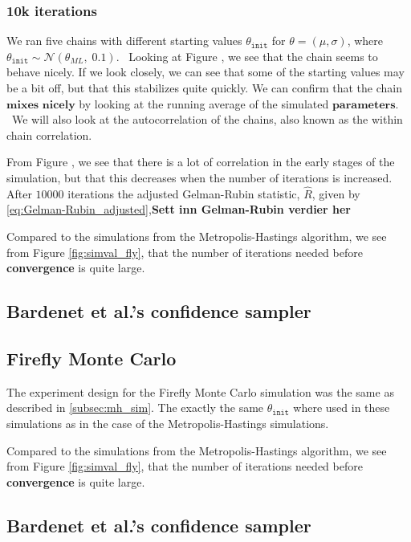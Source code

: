 \subsubsection{10k iterations}
We ran five chains with different starting values $\theta_{\texttt{init}}$ for $\theta = \left(\mu, \sigma\right)$, where $\theta_{\texttt{init}} \sim \mathcal{N}\left(\theta_{ML}, \; 0.1\right)$. 
\
Looking at Figure , we see that the chain seems to behave nicely. If we look closely, we can see that some of the starting values may be a bit off, but that this stabilizes quite quickly. We can confirm that the chain $\textbf{mixes nicely}$ by looking at the running average of the simulated $\textbf{parameters}$.
\
We will also look at the autocorrelation of the chains, also known as the within chain correlation. 

From Figure , we see that there is a lot of correlation in the early stages of the simulation, but that this decreases when the number of iterations is increased. After $10000$ iterations the adjusted Gelman-Rubin statistic, $\hat{R}$, given by \eqref{eq:Gelman-Rubin_adjusted},\textbf{Sett inn Gelman-Rubin verdier her}

Compared to the simulations from the Metropolis-Hastings algorithm, we see from Figure \ref{fig:simval_fly}, that the number of iterations needed before \textbf{convergence} is quite large. 


\subsection{Bardenet et al.'s confidence sampler}

\subsection{Firefly Monte Carlo}
The experiment design for the Firefly Monte Carlo simulation was the same as described in \ref{subsec:mh_sim}. The exactly the same $\theta_{\texttt{init}}$ where used in these simulations as in the case of the Metropolis-Hastings simulations. 

Compared to the simulations from the Metropolis-Hastings algorithm, we see from Figure \ref{fig:simval_fly}, that the number of iterations needed before \textbf{convergence} is quite large. 



\subsection{Bardenet et al.'s confidence sampler}





